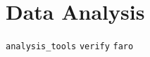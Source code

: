 \section{Data Analysis}
\label{sec:analysis}

\texttt{analysis\_tools}
\texttt{verify}
\texttt{faro}
